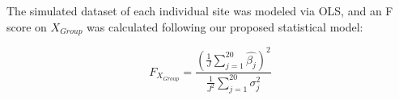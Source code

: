 The simulated dataset of each individual site was modeled via OLS, and an F score on $X_{Group}$ was calculated following our proposed statistical model:

\begin{equation}
F_{X_{Group}} = \frac{(\frac{1}{J}\sum_{j=1}^{20}\hat{\beta_j})^2}{\frac{1}{J^2}\sum_{j=1}^{20}\sigma^2_j}
\end{equation}